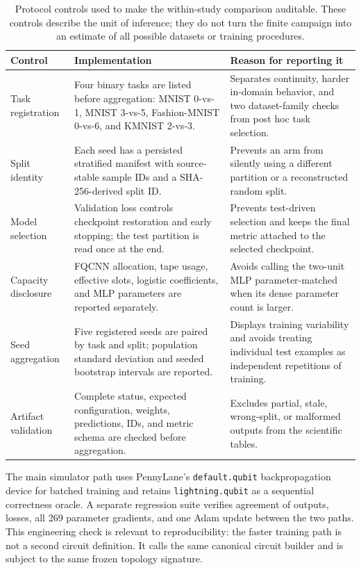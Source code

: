 \documentclass[conference]{IEEEtran}
\begin{document}
\begin{table}[!t]
\caption{Protocol controls used to make the within-study comparison auditable. These controls describe the unit of inference; they do not turn the finite campaign into an estimate of all possible datasets or training procedures.}
\label{tab:protocol-controls}
\centering
\small
\begin{tabular}{@{}p{}p{}p{}@{}}
\toprule
\textbf{Control} & \textbf{Implementation} & \textbf{Reason for reporting it} \\
\midrule
Task registration & Four binary tasks are listed before aggregation: MNIST 0-vs-1, MNIST 3-vs-5, Fashion-MNIST 0-vs-6, and KMNIST 2-vs-3. & Separates continuity, harder in-domain behavior, and two dataset-family checks from post hoc task selection. \\
Split identity & Each seed has a persisted stratified manifest with source-stable sample IDs and a SHA-256-derived split ID. & Prevents an arm from silently using a different partition or a reconstructed random split. \\
Model selection & Validation loss controls checkpoint restoration and early stopping; the test partition is read once at the end. & Prevents test-driven selection and keeps the final metric attached to the selected checkpoint. \\
Capacity disclosure & FQCNN allocation, tape usage, effective slots, logistic coefficients, and MLP parameters are reported separately. & Avoids calling the two-unit MLP parameter-matched when its dense parameter count is larger. \\
Seed aggregation & Five registered seeds are paired by task and split; population standard deviation and seeded bootstrap intervals are reported. & Displays training variability and avoids treating individual test examples as independent repetitions of training. \\
Artifact validation & Complete status, expected configuration, weights, predictions, IDs, and metric schema are checked before aggregation. & Excludes partial, stale, wrong-split, or malformed outputs from the scientific tables. \\
\bottomrule
\end{tabular}
\end{table}

The main simulator path uses PennyLane's \texttt{default.qubit} backpropagation
device for batched training and retains \texttt{lightning.qubit} as a sequential
correctness oracle. A separate regression suite verifies agreement of outputs,
losses, all 269 parameter gradients, and one Adam update between the two paths.
This engineering check is relevant to reproducibility: the faster training path
is not a second circuit definition. It calls the same canonical circuit builder
and is subject to the same frozen topology signature.
\end{document}
